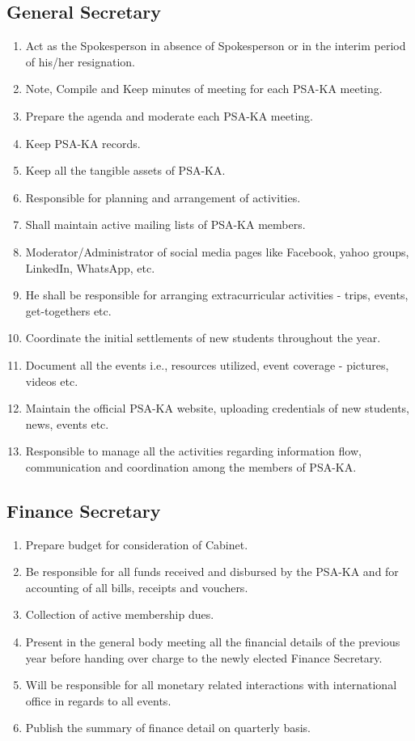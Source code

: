 \subsection{General Secretary }
\begin{enumerate}
	\item Act as the Spokesperson in absence of Spokesperson or in the interim period of his/her resignation. 
	\item Note, Compile and Keep minutes of meeting for each PSA-KA meeting. 
	\item Prepare the agenda and moderate each PSA-KA meeting. 
	\item Keep PSA-KA records. 
	\item Keep all the tangible assets of PSA-KA. 
	\item Responsible for planning and arrangement of activities. 
	\item Shall maintain active mailing lists of PSA-KA members. 
	\item Moderator/Administrator of social media pages like Facebook, yahoo groups, LinkedIn, WhatsApp, etc. 
	\item He shall be responsible for arranging extracurricular activities - trips, events, get-togethers etc. 
	\item Coordinate the initial settlements of new students throughout the year. 
	\item Document all the events i.e., resources utilized, event coverage - pictures, videos etc. 
	\item Maintain the official PSA-KA website, uploading credentials of new students, news, events etc. 
	\item Responsible to manage all the activities regarding information flow, communication and coordination among the members of PSA-KA.
\end{enumerate}
\subsection{Finance Secretary }
\begin{enumerate}
	\item Prepare budget for consideration of Cabinet. 
	\item Be responsible for all funds received and disbursed by the PSA-KA and for accounting of all bills, receipts and vouchers. 
	\item Collection of active membership dues. 
	\item Present in the general body meeting all the financial details of the previous year before handing over charge to the newly elected Finance Secretary. 
	\item Will be responsible for all monetary related interactions with international office in regards to all events. 
	\item Publish the summary of finance detail on quarterly basis. 
\end{enumerate}
